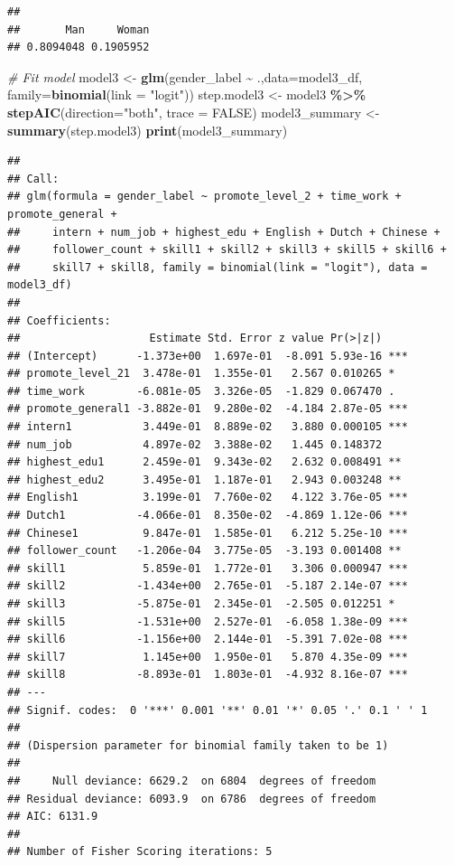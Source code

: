 \documentclass[11pt,]{article}
\newenvironment{Shaded}{\begin{snugshade}}{\end{snugshade}}
\newcommand{\AttributeTok}[1]{\textcolor[rgb]{0.13,0.29,0.53}{#1}}
\newcommand{\CommentTok}[1]{\textcolor[rgb]{0.56,0.35,0.01}{\textit{#1}}}
\newcommand{\ConstantTok}[1]{\textcolor[rgb]{0.56,0.35,0.01}{#1}}
\newcommand{\FunctionTok}[1]{\textcolor[rgb]{0.13,0.29,0.53}{\textbf{#1}}}
\newcommand{\NormalTok}[1]{#1}
\newcommand{\OtherTok}[1]{\textcolor[rgb]{0.56,0.35,0.01}{#1}}
\newcommand{\SpecialCharTok}[1]{\textcolor[rgb]{0.81,0.36,0.00}{\textbf{#1}}}
\newcommand{\StringTok}[1]{\textcolor[rgb]{0.31,0.60,0.02}{#1}}
\begin{document}
\begin{verbatim}
## 
##       Man     Woman 
## 0.8094048 0.1905952
\end{verbatim}

\begin{Shaded}
\begin{Highlighting}[]
\CommentTok{\# Fit model}
\NormalTok{model3 }\OtherTok{\textless{}{-}} \FunctionTok{glm}\NormalTok{(gender\_label }\SpecialCharTok{\textasciitilde{}}\NormalTok{ .,}\AttributeTok{data=}\NormalTok{model3\_df, }\AttributeTok{family=}\FunctionTok{binomial}\NormalTok{(}\AttributeTok{link =} \StringTok{"logit"}\NormalTok{))}
\NormalTok{step.model3 }\OtherTok{\textless{}{-}}\NormalTok{ model3 }\SpecialCharTok{\%\textgreater{}\%} \FunctionTok{stepAIC}\NormalTok{(}\AttributeTok{direction=}\StringTok{"both"}\NormalTok{, }\AttributeTok{trace =} \ConstantTok{FALSE}\NormalTok{) }
\NormalTok{model3\_summary }\OtherTok{\textless{}{-}} \FunctionTok{summary}\NormalTok{(step.model3)}
\FunctionTok{print}\NormalTok{(model3\_summary)}
\end{Highlighting}
\end{Shaded}

\begin{verbatim}
## 
## Call:
## glm(formula = gender_label ~ promote_level_2 + time_work + promote_general + 
##     intern + num_job + highest_edu + English + Dutch + Chinese + 
##     follower_count + skill1 + skill2 + skill3 + skill5 + skill6 + 
##     skill7 + skill8, family = binomial(link = "logit"), data = model3_df)
## 
## Coefficients:
##                    Estimate Std. Error z value Pr(>|z|)    
## (Intercept)      -1.373e+00  1.697e-01  -8.091 5.93e-16 ***
## promote_level_21  3.478e-01  1.355e-01   2.567 0.010265 *  
## time_work        -6.081e-05  3.326e-05  -1.829 0.067470 .  
## promote_general1 -3.882e-01  9.280e-02  -4.184 2.87e-05 ***
## intern1           3.449e-01  8.889e-02   3.880 0.000105 ***
## num_job           4.897e-02  3.388e-02   1.445 0.148372    
## highest_edu1      2.459e-01  9.343e-02   2.632 0.008491 ** 
## highest_edu2      3.495e-01  1.187e-01   2.943 0.003248 ** 
## English1          3.199e-01  7.760e-02   4.122 3.76e-05 ***
## Dutch1           -4.066e-01  8.350e-02  -4.869 1.12e-06 ***
## Chinese1          9.847e-01  1.585e-01   6.212 5.25e-10 ***
## follower_count   -1.206e-04  3.775e-05  -3.193 0.001408 ** 
## skill1            5.859e-01  1.772e-01   3.306 0.000947 ***
## skill2           -1.434e+00  2.765e-01  -5.187 2.14e-07 ***
## skill3           -5.875e-01  2.345e-01  -2.505 0.012251 *  
## skill5           -1.531e+00  2.527e-01  -6.058 1.38e-09 ***
## skill6           -1.156e+00  2.144e-01  -5.391 7.02e-08 ***
## skill7            1.145e+00  1.950e-01   5.870 4.35e-09 ***
## skill8           -8.893e-01  1.803e-01  -4.932 8.16e-07 ***
## ---
## Signif. codes:  0 '***' 0.001 '**' 0.01 '*' 0.05 '.' 0.1 ' ' 1
## 
## (Dispersion parameter for binomial family taken to be 1)
## 
##     Null deviance: 6629.2  on 6804  degrees of freedom
## Residual deviance: 6093.9  on 6786  degrees of freedom
## AIC: 6131.9
## 
## Number of Fisher Scoring iterations: 5
\end{verbatim}
\end{document}
